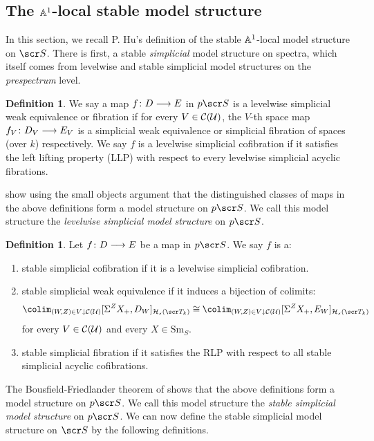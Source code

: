\documentclass{amsart}
\theoremstyle{definition}
\newtheorem{defn}[thm]{Definition}
\begin{document}
\subsection{The $\mathbb{A}^1$-local stable model structure}\label{subsec:local}
In this section, we recall P. Hu's definition of the stable $\mathbb{A}^1$-local model structure on $\sS$. There is first, a stable \emph{simplicial} model structure on spectra, which itself comes from levelwise and stable simplicial model structures on the \emph{prespectrum} level. 

\begin{defn}
We say a map $f \colon D \longrightarrow E$ in $p\sS$ is a levelwise simplicial weak equivalence or fibration if for every $V \in {\mathcal{C}}({\mathcal{U}})$, the $V$-th space map $f_V \colon D_V \longrightarrow E_V$ is a simplicial weak equivalence or simplicial fibration of spaces (over $k$) respectively. We say $f$ is a levelwise simplicial cofibration if it satisfies the left lifting property (LLP) with respect to every levelwise simplicial acyclic fibrations. 
\end{defn}

\cite[Proposition 5.10 and Chapter 15]{Hu03} show using the small objects argument that the distinguished classes of maps in the above definitions form a model structure on $p\sS$. We call this model structure the \emph{levelwise simplicial model structure} on $p\sS$. 

\begin{defn}
Let $f \colon D \longrightarrow E$ be a map in $p\sS$. We say $f$ is a:
\begin{enumerate}
\item stable simplicial cofibration if it is a levelwise simplicial cofibration.
\item stable simplicial weak equivalence if it induces a bijection of colimits:
\[\colim_{(W,Z) \in V \downarrow \oC(\oU)} [\SI^Z X_+, D_W]_{\oH_s(\sT_{k})} \iso \colim_{(W,Z) \in V \downarrow \oC(\oU)} [\SI^Z X_+, E_W]_{\oH_s(\sT_{k})}\]
\noindent for every $V \in {\mathcal{C}}({\mathcal{U}})$ and every $X \in \mathrm{Sm}_S$.
\item stable simplicial fibration if it satisfies the RLP with respect to all stable simplicial acyclic cofibrations.
\end{enumerate}
\end{defn}

The Bousfield-Friedlander theorem of \cite[Theorem A.7]{BF1978} shows that the above definitions form a model structure on $p\sS$. We call this model structure the \emph{stable simplicial model structure} on $p\sS$. We can now define the stable simplicial model structure on $\sS$ by the following definitions.
\end{document}
